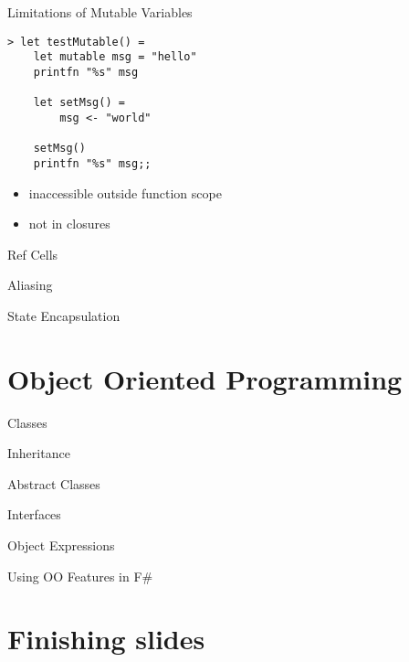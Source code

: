 \documentclass{beamer}
\begin{document}
\begin{frame}[fragile]{Limitations of Mutable Variables}
  \begin{verbatim}
> let testMutable() =
    let mutable msg = "hello"
    printfn "%s" msg

    let setMsg() =
        msg <- "world"

    setMsg()
    printfn "%s" msg;;
  \end{verbatim}
  \pause
  \begin{itemize}
    \item inaccessible outside function scope
    \item not in closures
  \end{itemize}
\end{frame}

\begin{frame}{Ref Cells}
\end{frame}

\begin{frame}{Aliasing}
\end{frame}

\begin{frame}{State Encapsulation}
\end{frame}

\section{Object Oriented Programming}
\frame{\tableofcontents[currentsection]}

\begin{frame}{Classes}
\end{frame}

\begin{frame}{Inheritance}
\end{frame}

\begin{frame}{Abstract Classes}
\end{frame}

\begin{frame}{Interfaces}
\end{frame}

\begin{frame}{Object Expressions}
\end{frame}

\begin{frame}{Using OO Features in F\#}
\end{frame}

\section{Finishing slides}
\frame{\tableofcontents[currentsection]}
\end{document}
